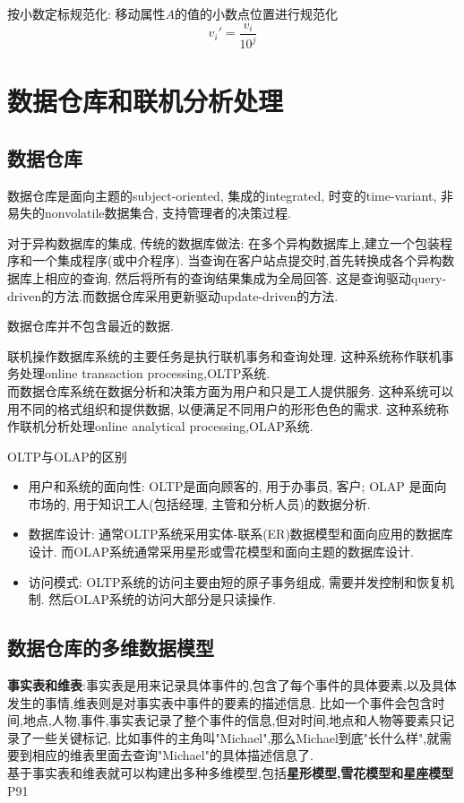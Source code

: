 \documentclass{article}
\begin{document}
按小数定标规范化: 移动属性$A$的值的小数点位置进行规范化
$$
v_i' = \dfrac{v_i}{10^j}
$$

\section{数据仓库和联机分析处理}
\subsection{数据仓库}
数据仓库是面向主题的subject-oriented, 集成的integrated, 时变的time-variant, 非易失的nonvolatile数据集合, 支持管理者的决策过程.

对于异构数据库的集成, 传统的数据库做法: 在多个异构数据库上,建立一个包装程序和一个集成程序(或中介程序). 当查询在客户站点提交时,首先转换成各个异构数据库上相应的查询, 然后将所有的查询结果集成为全局回答. 这是查询驱动query-driven的方法.而数据仓库采用更新驱动update-driven的方法.\par
数据仓库并不包含最近的数据.

联机操作数据库系统的主要任务是执行联机事务和查询处理. 这种系统称作联机事务处理online transaction processing,OLTP系统. \\
而数据仓库系统在数据分析和决策方面为用户和只是工人提供服务. 这种系统可以用不同的格式组织和提供数据, 以便满足不同用户的形形色色的需求. 这种系统称作联机分析处理online analytical processing,OLAP系统.\par
OLTP与OLAP的区别
\begin{itemize}
	\item 用户和系统的面向性: OLTP是面向顾客的, 用于办事员, 客户; OLAP 是面向市场的, 用于知识工人(包括经理, 主管和分析人员)的数据分析.
	\item 数据库设计: 通常OLTP系统采用实体-联系(ER)数据模型和面向应用的数据库设计. 而OLAP系统通常采用星形或雪花模型和面向主题的数据库设计.
	\item 访问模式: OLTP系统的访问主要由短的原子事务组成, 需要并发控制和恢复机制. 然后OLAP系统的访问大部分是只读操作.
\end{itemize}

\subsection{数据仓库的多维数据模型}
\textbf{事实表和维表}:事实表是用来记录具体事件的,包含了每个事件的具体要素,以及具体发生的事情,维表则是对事实表中事件的要素的描述信息.
比如一个事件会包含时间,地点,人物,事件,事实表记录了整个事件的信息,但对时间,地点和人物等要素只记录了一些关键标记,
比如事件的主角叫"Michael",那么Michael到底"长什么样",就需要到相应的维表里面去查询"Michael"的具体描述信息了.\\
基于事实表和维表就可以构建出多种多维模型,包括\textbf{星形模型,雪花模型和星座模型}P91
\end{document}
